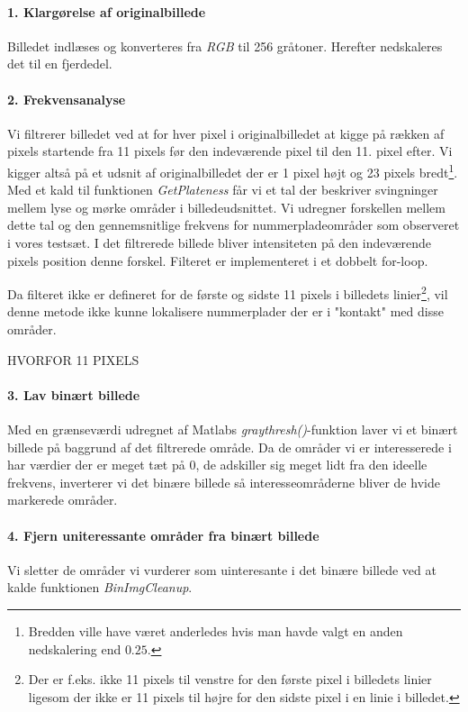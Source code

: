 \paragraph{1. Klargørelse af originalbillede}
Billedet indlæses og konverteres fra \textit{RGB} til 256 gråtoner. Herefter nedskaleres det til en fjerdedel.

\paragraph{2. Frekvensanalyse}
Vi filtrerer billedet ved at for hver pixel i originalbilledet at kigge på rækken af pixels startende fra 11 pixels før den indeværende pixel til den 11. pixel efter. Vi kigger altså på et udsnit af originalbilledet der er 1 pixel højt og 23 pixels bredt\footnote{Bredden ville have været anderledes hvis man havde valgt en anden nedskalering end $0.25$.}. Med et kald til funktionen \textit{GetPlateness} får vi et tal der beskriver svingninger mellem lyse og mørke områder i billedeudsnittet. Vi udregner forskellen mellem dette tal og den gennemsnitlige frekvens for nummerpladeområder som observeret i vores testsæt. I det filtrerede billede bliver intensiteten på den indeværende pixels position denne forskel. Filteret er implementeret i et dobbelt for-loop.

Da filteret ikke er defineret for de første og sidste 11 pixels i billedets linier\footnote{Der er f.eks. ikke 11 pixels til venstre for den første pixel i billedets linier ligesom der ikke er 11 pixels til højre for den sidste pixel i en linie i billedet.}, vil denne metode ikke kunne lokalisere nummerplader der er i "kontakt" med disse områder.

HVORFOR 11 PIXELS
\paragraph{3. Lav binært billede}
Med en grænseværdi udregnet af Matlabs \textit{graythresh()}-funktion laver vi et binært billede på baggrund af det filtrerede område. Da de områder vi er interesserede i har værdier der er meget tæt på 0, de adskiller sig meget lidt fra den ideelle frekvens, inverterer vi det binære billede så interesseområderne bliver de hvide markerede områder. 

\paragraph{4. Fjern uniteressante områder fra binært billede}
Vi sletter de områder vi vurderer som uinteresante i det binære billede ved at kalde funktionen \textit{BinImgCleanup}.

